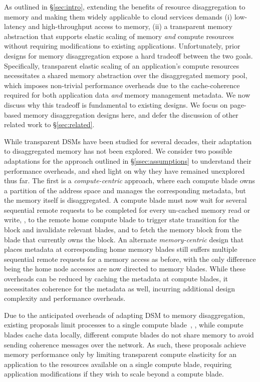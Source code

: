 \noindent
As outlined in \S\ref{sec:intro}, extending the benefits of resource disaggregation to memory and making them widely applicable to cloud services demands (i) low-latency and high-throughput access to memory, (ii) a transparent memory abstraction that supports elastic scaling of memory \textit{and} compute resources without requiring modifications to existing applications. Unfortunately, prior designs for memory disaggregation expose a hard tradeoff between the two goals. Specifically, transparent elastic scaling of an application's compute resources necessitates a shared memory abstraction over the disaggregated memory pool, which imposes non-trivial performance overheads due to the cache-coherence required for both application data \textit{and} memory management metadata. We now discuss why this tradeoff is fundamental to existing designs. We focus on page-based memory disaggregation designs here, and defer the discussion of other related work to \S\ref{sec:related}.

 While transparent DSMs have been studied for several decades, their adaptation to disaggregated memory has not been explored. We consider two possible adaptations for the approach outlined in \S\ref{ssec:assumptions} to understand their performance overheads, and shed light on why they have remained unexplored thus far. The first is a \textit{compute-centric} approach, where each compute blade owns a partition of the address space and manages the corresponding metadata, but the memory itself is disaggregated. A compute blade must now wait for several sequential remote requests to be completed for every un-cached memory read or write, \eg, to the remote home compute blade to trigger state transition for the block and invalidate relevant blades, and to fetch the memory block from the blade that currently owns the block. An alternate \textit{memory-centric} design that places metadata at corresponding home memory blades still suffers multiple sequential remote requests for a memory access as before, with the only difference being the home node accesses are now directed to memory blades. While these overheads can be reduced by caching the metadata at compute blades, it necessitates coherence for the metadata as well, incurring additional design complexity and performance overheads.

 Due to the anticipated overheads of adapting DSM to memory disaggregation, existing proposals limit processes to a single compute blade~\cite{industry0, industry1, memdisagg1, infiniswap, legoos, disagg}, \ie, while compute blades cache data locally, different compute blades do not share memory to avoid sending coherence messages over the network. As such, these proposals achieve memory performance only by limiting transparent compute elasticity for an application to the resources available on a single compute blade, requiring application modifications if they wish to scale beyond a compute blade. 

